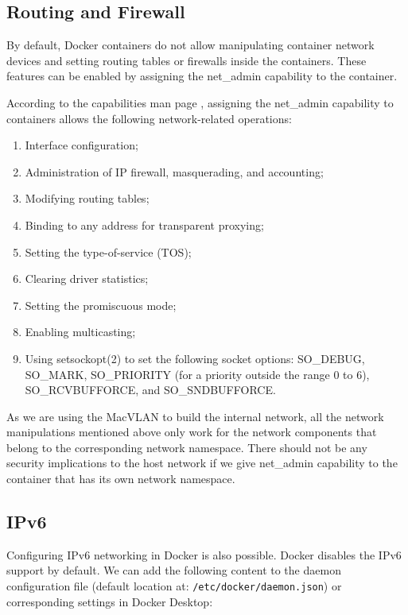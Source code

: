 \documentclass[article]{aaltoseries}
\begin{document}
\subsection{Routing and Firewall}

By default, Docker containers do not allow manipulating container network devices and setting routing tables or firewalls inside the containers. These features can be enabled by assigning the net\_admin capability to the container.

According to the capabilities man page \cite{capabilities}, assigning the net\_admin capability to containers allows the following network-related operations:
\begin{enumerate}
\setlength{\itemsep}{0pt}
\setlength{\parsep}{0pt}
\setlength{\parskip}{0pt}
\item Interface configuration;
\item Administration of IP firewall, masquerading, and accounting;
\item Modifying routing tables;
\item Binding to any address for transparent proxying;
\item Setting the type-of-service (TOS);
\item Clearing driver statistics;
\item Setting the promiscuous mode;
\item Enabling multicasting;
\item Using setsockopt(2) to set the following socket options:
SO\_DEBUG, SO\_MARK, SO\_PRIORITY (for a priority outside the
range 0 to 6), SO\_RCVBUFFORCE, and SO\_SNDBUFFORCE.
\end{enumerate}

As we are using the MacVLAN to build the internal network, all the network manipulations mentioned above only work for the network components that belong to the corresponding network namespace. There should not be any security implications to the host network if we give net\_admin capability to the container that has its own network namespace.

\subsection{IPv6}
Configuring IPv6 networking in Docker \cite{docker_documentation_ipv6_2023} is also possible. Docker disables the IPv6 support by default. We can add the following content to the daemon configuration file (default location at: \texttt{/etc/docker/daemon.json}) or corresponding settings in Docker Desktop:
\end{document}
